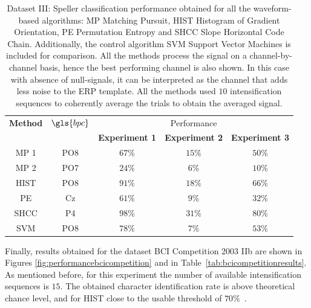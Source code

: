 \begin{table}[h!]
\caption[Dataset III - Speller Performance]{Dataset III: Speller classification performance obtained for all the waveform-based algorithms: MP Matching Pursuit, HIST Histogram of Gradient Orientation, PE Permutation Entropy and SHCC Slope Horizontal Code Chain. Additionally, the control algorithm SVM Support Vector Machines is included for comparison.  All the methods process the signal on a channel-by-channel basis, hence the best performing channel is also shown. In this case with absence of null-signals, it can be interpreted as the channel that adds less noise to the ERP template.  All the methods used $10$ intensification sequences to coherently average the trials to obtain the averaged signal. }
\centering
\begin{tabular}{ccccc}
\toprule
\textbf{Method}	& \textbf{$\gls{bpc}$} &   \multicolumn{3}{c}{Performance} \\
 	&  &  \textbf{Experiment 1} & \textbf{Experiment 2}	& \textbf{Experiment 3}\\
\midrule
MP 1 & PO8  & $67\%$ & $15\%$ & $50\%$\\
MP 2 & PO7 & $24\%$ & $6\%$ & $10\%$\\
HIST  & PO8 & $91\%$ & $18\%$ & $66\%$\\
PE     & Cz & $61\%$ & $9\%$ & $32\%$\\
SHCC & P4 & $98\%$ & $31\%$ & $80\%$\\
SVM     & PO8  & $78\%$ & $7\%$ & $53\%$\\
\bottomrule
\end{tabular}
\label{tab:results}
\end{table}

Finally, results obtained for the dataset BCI Competition 2003 IIb are shown in Figures \ref{fig:performancebcicompetition} and in Table~\ref{tab:bcicompetitionresults}.  As mentioned before, for this experiment the number of available intensification sequences is $15$. The obtained character identification rate is above theoretical chance level, and for HIST close to the usable threshold of $70\%$~\cite{Kathner2017}.

